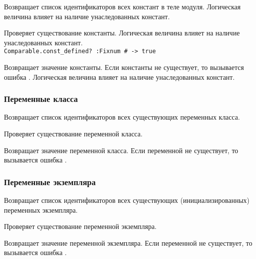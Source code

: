 \begin{methodlist}
  Возвращает список идентификаторов всех констант в теле модуля. Логическая величина влияет на наличие унаследованных констант.

  Проверяет существование константы. Логическая величина влияет на наличие унаследованных констант.
  \\\verb!Comparable.const_defined? :Fixnum # -> true!

  Возвращает значение константы. Если константы не существует, то вызывается ошибка . Логическая величина влияет на наличие унаследованных констант.
\end{methodlist}

\subsubsection*{Переменные класса} 

\begin{methodlist}
  Возвращает список идентификаторов всех существующих переменных класса.

  Проверяет существование переменной класса. 
 
  Возвращает значение переменной класса. Если переменной не существует, то вызывается ошибка . 
\end{methodlist}

\subsubsection*{Переменные экземпляра}

\begin{methodlist}
  Возвращает список идентификаторов всех существующих (инициализированных) переменных экземпляра.

  Проверяет существование переменной экземпляра. 
 
  Возвращает значение переменной экземпляра. Если переменной не существует, то вызывается ошибка . 
\end{methodlist} 

